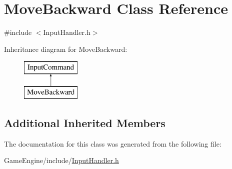 \hypertarget{class_move_backward}{}\section{Move\+Backward Class Reference}
\label{class_move_backward}


{\ttfamily \#include $<$Input\+Handler.\+h$>$}

Inheritance diagram for Move\+Backward\+:\begin{figure}[H]
\begin{center}
\leavevmode
\includegraphics[height=2.000000cm]{class_move_backward}
\end{center}
\end{figure}
\subsection*{Additional Inherited Members}


The documentation for this class was generated from the following file\+:\begin{DoxyCompactItemize}
\item 
Game\+Engine/include/\mbox{\hyperlink{_input_handler_8h}{Input\+Handler.\+h}}\end{DoxyCompactItemize}
